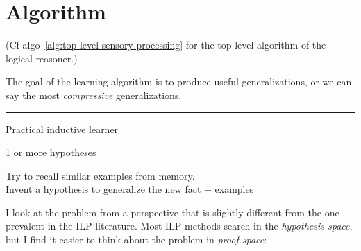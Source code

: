 %
%
%
%
%
%

\section{Algorithm}

(Cf algo~\ref{alg:top-level-sensory-processing} for the top-level algorithm of the logical reasoner.)

The goal of the learning algorithm is to produce useful generalizations, or we can say the most \textit{compressive} generalizations.

\underconst
\hrule

\begin{algorithm}[H]
\caption{Practical inductive learner}
{1 or more hypotheses}
\begin{algtab}

Try to recall similar examples from memory.\\

Invent a hypothesis to generalize the new fact + examples\\

\end{algtab}
\end{algorithm}
\vspace{-0.7cm}

I look at the problem from a perspective that is slightly different from the one prevalent in the ILP literature.  Most ILP methods search in the \textit{hypothesis space}, but I find it easier to think about the problem in \textit{proof space}:\\

